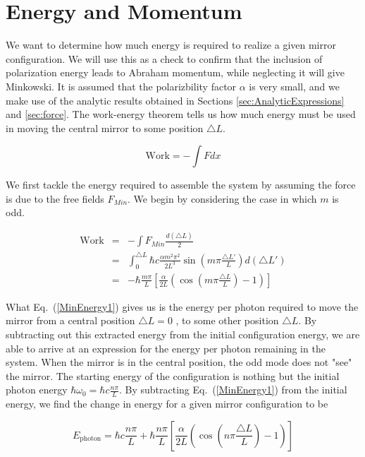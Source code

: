 \section{Energy and Momentum}
\label{sec:Energy}

We want to determine how much energy is required to realize a given mirror configuration.  We will use this as a check to confirm that the inclusion of polarization energy leads to Abraham momentum, while neglecting it will give Minkowski. It is assumed that the polarizbility factor $\alpha$ is very small, and we make use of the analytic results obtained in Sections \ref{sec:AnalyticExpressions} and \ref{sec:force}. The work-energy theorem tells us how much energy must be used in moving the central mirror to some position $\triangle L$.

\begin{equation}
\mathrm{Work}=-\int Fdx
\label{workenergy1}
\end{equation}


We first tackle the energy required to assemble the system by assuming the force is due to the free fields $F_{Min}$. We begin by considering the case in which $m$ is odd.

\begin{eqnarray}
\mathrm{Work}&=&-\int F_{Min}\frac{d\left(\triangle L\right)}{2} \nonumber \\
&=&\int_{0}^{\triangle L}\hbar c\frac{\alpha m^{2}\pi^{2}}{2L^{3}}\sin(m\pi\frac{\triangle L'}{L})d\left(\triangle L'\right) \nonumber \\
&=&-\hbar\frac{m\pi}{L}\left[\frac{\alpha}{2L}\left(\cos(m\pi\frac{\triangle L}{L})-1\right)\right]
\label{MinEnergy1}
\end{eqnarray}

What Eq.\ (\ref{MinEnergy1}) gives us is the energy per photon required to move the mirror from a central position $\triangle L=0$ , to some other position $\triangle L$.  By subtracting out this extracted energy from the initial configuration energy, we are able to arrive at an expression for the energy per photon remaining in the system.  When the mirror is in the central position, the odd mode does not "see" the mirror. The starting energy of the configuration is nothing but the initial photon energy $\hbar\omega_{0}=\hbar c\frac{n\pi}{L}$.  By subtracting Eq.\ (\ref{MinEnergy1}) from the initial energy, we find the change in energy for a given mirror configuration to be


\begin{equation}
E_{\mathrm{photon}}=\hbar c\frac{n\pi}{L}+\hbar\frac{n\pi}{L}\left[\frac{\alpha}{2L}\left(\cos(n\pi\frac{\triangle L}{L})-1\right)\right]
\label{MinEnergy2}
\end{equation}

